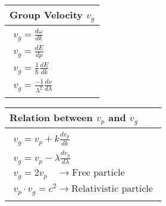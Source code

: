 \begin{minipage}{0.25\textwidth}
	\begin{table}[H]
		\centering
		\renewcommand{\arraystretch}{2.5}
		\begin{tabularx}{1\textwidth} { 
				| >{\centering\arraybackslash}X 
				|   }
			\hline
			\rowcolor{ocrel} \large \textbf{Group Velocity $v_{g}$} \\
			\hline
			\hline
			$\begin{array}{l}
			v_{g} =\frac{d\omega}{dk} \\
			v_{g} =\frac{dE}{dp}\\
			v_{g}= \frac{1}{ \hbar }\frac{d E}{d   k}\\
			v_{g}= \frac{-1}{ \lambda^{2} }\frac{d \nu}{d \lambda}
			\end{array}$\\ \hline
			
			
		\end{tabularx}
		
	\end{table}
\end{minipage}
\begin{minipage}{0.40\textwidth}
	\begin{table}[H]
		\centering
		\renewcommand{\arraystretch}{2.5}
		\begin{tabularx}{1\textwidth} { 
				| >{\centering\arraybackslash}X 
				|   }
			\hline
			\rowcolor{ocrel} \large \textbf{Relation between $v_{p}$ and $v_{g}$} \\
			\hline
			\hline
			$\begin{array}{l}
			v_{g}=v_{p}+k \frac{d v_{p}}{d{k}}\\
			v_{g} =v_{p}-\lambda \frac{d v_{p}}{d \lambda} \\
			v_{g} =2v_{p}\quad \rightarrow\text{Free particle} \\
			v_{p} \cdot v_{g}=c^{2}\rightarrow\text{Relativistic particle}
			\end{array}$\\ \hline
			
			
		\end{tabularx}
		
	\end{table}
\end{minipage}
